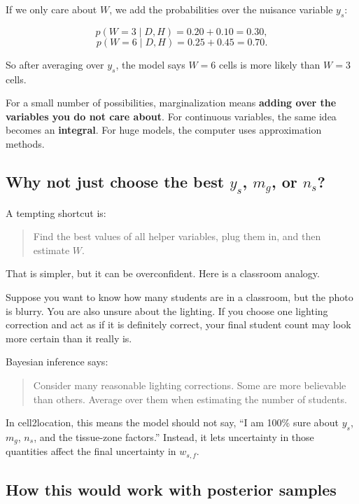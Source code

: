 \documentclass[11pt]{article}
\begin{document}
If we only care about $W$, we add the probabilities over the nuisance variable $y_s$:

\[
p(W=3\mid D,H)=0.20+0.10=0.30,
\]
\[
p(W=6\mid D,H)=0.25+0.45=0.70.
\]

So after averaging over $y_s$, the model says $W=6$ cells is more likely than $W=3$ cells.

\begin{bigidea}
For a small number of possibilities, marginalization means \textbf{adding over the variables you do not care about}. For continuous variables, the same idea becomes an \textbf{integral}. For huge models, the computer uses approximation methods.
\end{bigidea}

\subsection{Why not just choose the best $y_s$, $m_g$, or $n_s$?}

A tempting shortcut is:

\begin{quote}
Find the best values of all helper variables, plug them in, and then estimate $W$.
\end{quote}

That is simpler, but it can be overconfident. Here is a classroom analogy.

Suppose you want to know how many students are in a classroom, but the photo is blurry. You are also unsure about the lighting. If you choose one lighting correction and act as if it is definitely correct, your final student count may look more certain than it really is.

Bayesian inference says:

\begin{quote}
Consider many reasonable lighting corrections. Some are more believable than others. Average over them when estimating the number of students.
\end{quote}

In cell2location, this means the model should not say, ``I am 100\% sure about $y_s$, $m_g$, $n_s$, and the tissue-zone factors.'' Instead, it lets uncertainty in those quantities affect the final uncertainty in $w_{s,f}$.

\subsection{How this would work with posterior samples}
\end{document}
